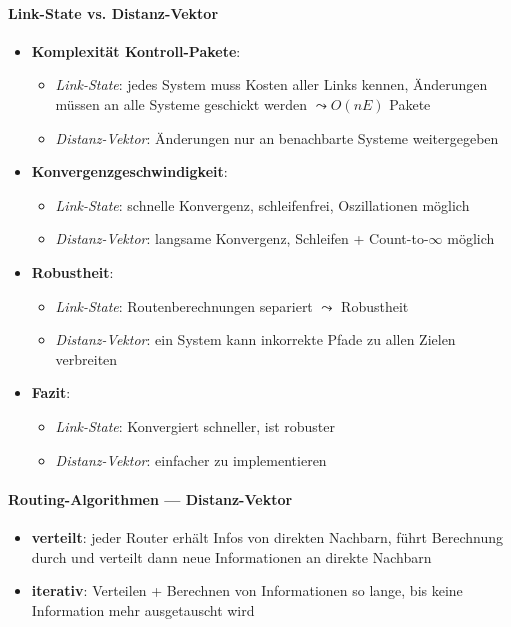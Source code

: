 \paragraph{Link-State vs. Distanz-Vektor}
\begin{itemize}
	\item \textbf{Komplexität Kontroll-Pakete}:
	\begin{itemize}
    \item \emph{Link-State}: jedes System muss Kosten aller Links kennen, Änderungen müssen an alle Systeme geschickt werden \( \leadsto  O(nE) \) Pakete
    \item \emph{Distanz-Vektor}: Änderungen nur an benachbarte Systeme weitergegeben
  \end{itemize}
	\item \textbf{Konvergenzgeschwindigkeit}:
	\begin{itemize}
    \item \emph{Link-State}: schnelle Konvergenz, schleifenfrei, Oszillationen möglich
    \item \emph{Distanz-Vektor}: langsame Konvergenz, Schleifen + Count-to-\( \infty \) möglich
  \end{itemize}
	\item \textbf{Robustheit}:
	\begin{itemize}
    \item \emph{Link-State}: Routenberechnungen separiert \( \leadsto \) Robustheit
    \item \emph{Distanz-Vektor}: ein System kann inkorrekte Pfade zu allen Zielen verbreiten
  \end{itemize}
	\item \textbf{Fazit}:
	\begin{itemize}
    \item \emph{Link-State}: Konvergiert schneller, ist robuster
    \item \emph{Distanz-Vektor}: einfacher zu implementieren
  \end{itemize}
\end{itemize}

\paragraph{Routing-Algorithmen --- Distanz-Vektor}
\begin{itemize}
    \item \textbf{verteilt}: jeder Router erhält Infos von direkten Nachbarn, führt Berechnung durch und verteilt dann neue Informationen an direkte Nachbarn
    \item \textbf{iterativ}: Verteilen + Berechnen von Informationen so lange, bis keine Information mehr ausgetauscht wird

\end{itemize}


